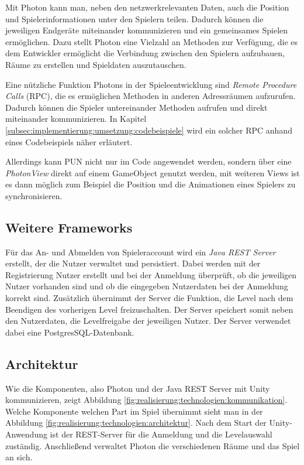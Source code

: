 Mit Photon kann man, neben den netzwerkrelevanten Daten, auch die Position und Spielerinformationen unter den Spielern teilen. Dadurch können die jeweiligen Endgeräte miteinander kommunizieren und ein gemeinsames Spielen ermöglichen. Dazu stellt Photon eine Vielzahl an Methoden zur Verfügung, die es dem Entwickler ermöglicht die Verbindung zwischen den Spielern aufzubauen, Räume zu erstellen und Spieldaten auszutauschen.

Eine nützliche Funktion Photons in der Spieleentwicklung sind \textit{Remote Procedure Calls} (RPC), die es ermöglichen Methoden in anderen Adressräumen aufzurufen. Dadurch können die Spieler untereinander Methoden aufrufen und direkt miteinander kommunizieren. In Kapitel \ref{subsec:implementierung:umsetzung:codebeispiele} wird ein solcher RPC anhand eines Codebeispiels näher erläutert.

Allerdings kann PUN nicht nur im Code angewendet werden, sondern über eine \textit{PhotonView} direkt auf einem GameObject genutzt werden, mit weiteren Views ist es dann möglich zum Beispiel die Position und die Animationen eines Spielers zu synchronisieren. 

\subsection{Weitere Frameworks}
\label{subsec:realisierung:technologien:frameworks}
Für das An- und Abmelden von Spieleraccount wird ein \textit{Java REST Server} erstellt, der die Nutzer verwaltet und persistiert. Dabei werden mit der Registrierung Nutzer erstellt und bei der Anmeldung überprüft, ob die jeweiligen Nutzer vorhanden sind und ob die eingegeben Nutzerdaten bei der Anmeldung korrekt sind. Zusätzlich übernimmt der Server die Funktion, die Level nach dem Beendigen des vorherigen Level freizuschalten. Der Server speichert somit neben den Nutzerdaten, die Levelfreigabe der jeweiligen Nutzer. Der Server verwendet dabei eine PostgresSQL-Datenbank.

\subsection{Architektur}
\label{subsec:realisierung:technologien:architektur}
Wie die Komponenten, also Photon und der Java REST Server mit Unity kommunizieren, zeigt Abbildung \ref{fig:realisierung:technologien:kommunikation}. Welche Komponente welchen Part im Spiel übernimmt sieht man in der Abbildung \ref{fig:realisierung:technologien:architektur}. Nach dem Start der Unity-Anwendung ist der REST-Server für die Anmeldung und die Levelauswahl zuständig. Anschließend verwaltet Photon die verschiedenen Räume und das Spiel an sich.


